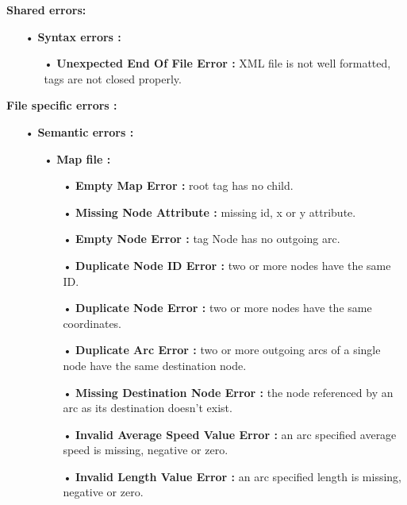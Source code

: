 \documentclass[paper=a4, fontsize=11pt]{report}
\numberwithin{equation}{section}		%
\numberwithin{figure}{section}		%
\numberwithin{table}{section}		%
\begin{document}
\textbf{Shared errors:}
\begin{itemize}
  \item[•] \textbf{Syntax errors :}
  \begin{itemize}
    \item[•] \textbf{Unexpected End Of File Error :} XML file is not well formatted, tags are not closed properly.
  \end{itemize}
\end{itemize}

\textbf{File specific errors :}
\begin{itemize}
  \item[•] \textbf{Semantic errors :}
  \begin{itemize}
    \item[•] \textbf{Map file :}
    \begin{itemize}
      \item[•] \textbf{Empty Map Error :} root tag has no child.
      \item[•] \textbf{Missing Node Attribute :} missing id, x or y attribute.
      \item[•] \textbf{Empty Node Error :} tag Node has no outgoing arc.
      \item[•] \textbf{Duplicate Node ID Error :} two or more nodes have the same ID.
      \item[•] \textbf{Duplicate Node Error :} two or more nodes have the same coordinates.
      \item[•] \textbf{Duplicate Arc Error :} two or more outgoing arcs of a single node have the same destination node. 
      \item[•] \textbf{Missing Destination Node Error :} the node referenced by an arc as its destination doesn’t exist. 
      \item[•] \textbf{Invalid Average Speed Value Error :} an arc specified average speed is missing, negative or zero. 
      \item[•] \textbf{Invalid Length Value Error :} an arc specified length is missing, negative or zero.
    \end{itemize}


\end{itemize}
\end{itemize}
\end{document}
